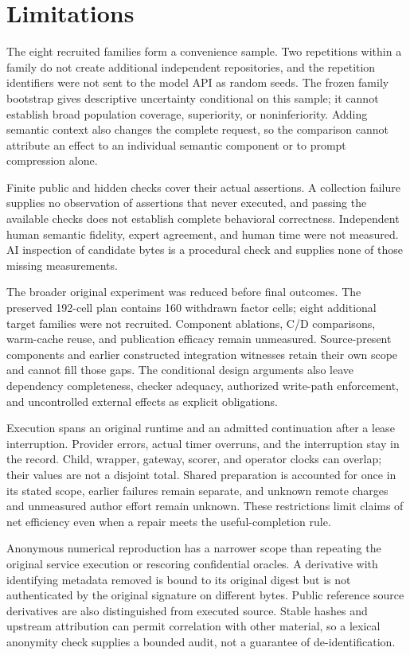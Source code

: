 \section{Limitations}

The eight recruited families form a convenience sample. Two repetitions within
a family do not create additional independent repositories, and the repetition
identifiers were not sent to the model API as random seeds. The frozen
family bootstrap gives descriptive uncertainty conditional on this sample;
it cannot establish broad population coverage, superiority, or noninferiority.
Adding semantic context also changes the complete request, so the comparison
cannot attribute an effect to an individual semantic component or to prompt
compression alone.

Finite public and hidden checks cover their actual assertions. A collection
failure supplies no observation of assertions that never executed, and passing
the available checks does not establish complete behavioral correctness.
Independent human semantic fidelity, expert agreement, and human time were not
measured. AI inspection of candidate bytes is a procedural check and supplies
none of those missing measurements.

The broader original experiment was reduced before final outcomes. The
preserved 192-cell plan contains 160 withdrawn factor cells; eight additional
target families were not recruited. Component ablations, C/D comparisons,
warm-cache reuse, and publication efficacy remain unmeasured. Source-present
components and earlier constructed integration witnesses retain their own
scope and cannot fill those gaps. The conditional design arguments also leave
dependency completeness, checker adequacy, authorized write-path enforcement,
and uncontrolled external effects as explicit obligations.

Execution spans an original runtime and an admitted continuation after a lease
interruption. Provider errors, actual timer overruns, and the interruption stay
in the record. Child, wrapper, gateway, scorer, and operator clocks can overlap;
their values are not a disjoint total. Shared preparation is accounted for
once in its stated scope, earlier failures remain separate, and unknown remote
charges and unmeasured author effort remain unknown. These restrictions limit
claims of net efficiency even when a repair meets the useful-completion rule.

Anonymous numerical reproduction has a narrower scope than repeating the
original service execution or rescoring confidential oracles. A derivative
with identifying metadata removed is bound to its original digest but is not
authenticated by the original signature on different bytes. Public reference
source derivatives are also distinguished from executed source. Stable hashes
and upstream attribution can permit correlation with other material, so a
lexical anonymity check supplies a bounded audit, not a guarantee of
de-identification.
